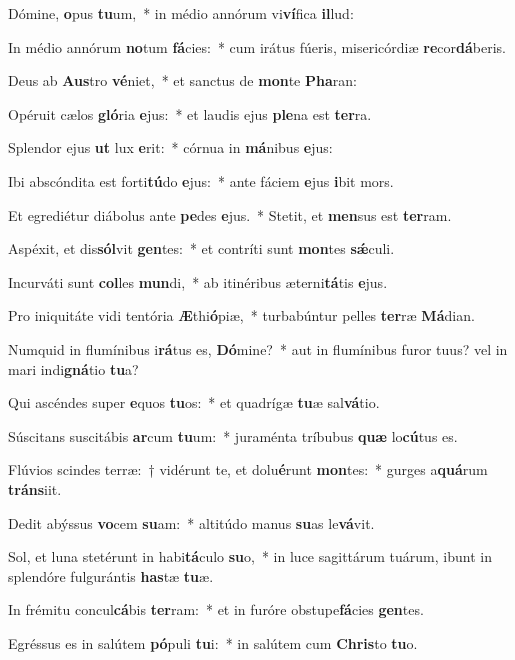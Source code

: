 \item Dómine, \textbf{o}pus \textbf{tu}um,~* in médio annórum vi\textbf{ví}fica \textbf{il}lud:
\item In médio annórum \textbf{no}tum \textbf{fá}cies:~* cum irátus fúeris, misericórdiæ \textbf{re}cor\textbf{dá}beris.
\item Deus ab \textbf{Aus}tro \textbf{vé}niet,~* et sanctus de \textbf{mon}te \textbf{Pha}ran:
\item Opéruit cælos \textbf{gló}ria \textbf{e}jus:~* et laudis ejus \textbf{ple}na est \textbf{ter}ra.
\item Splendor ejus \textbf{ut} lux \textbf{e}rit:~* córnua in \textbf{má}nibus \textbf{e}jus:
\item Ibi abscóndita est forti\textbf{tú}do \textbf{e}jus:~* ante fáciem \textbf{e}jus \textbf{i}bit mors.
\item Et egrediétur diábolus ante \textbf{pe}des \textbf{e}jus.~* Stetit, et \textbf{men}sus est \textbf{ter}ram.
\item Aspéxit, et dis\textbf{sól}vit \textbf{gen}tes:~* et contríti sunt \textbf{mon}tes \textbf{sǽ}culi.
\item Incurváti sunt \textbf{col}les \textbf{mun}di,~* ab itinéribus æterni\textbf{tá}tis \textbf{e}jus.
\item Pro iniquitáte vidi tentória \textbf{Æ}thi\textbf{ó}piæ,~* turbabúntur pelles \textbf{ter}ræ \textbf{Má}dian.
\item Numquid in flumínibus i\textbf{rá}tus es, \textbf{Dó}mine?~* aut in flumínibus furor tuus? vel in mari indi\textbf{gná}tio \textbf{tu}a?
\item Qui ascéndes super \textbf{e}quos \textbf{tu}os:~* et quadrígæ \textbf{tu}æ sal\textbf{vá}tio.
\item Súscitans suscitábis \textbf{ar}cum \textbf{tu}um:~* juraménta tríbubus \textbf{quæ} lo\textbf{cú}tus es.
\item Flúvios scindes terræ:~† vidérunt te, et dolu\textbf{é}runt \textbf{mon}tes:~* gurges a\textbf{quá}rum \textbf{tráns}iit.
\item Dedit abýssus \textbf{vo}cem \textbf{su}am:~* altitúdo manus \textbf{su}as le\textbf{vá}vit.
\item Sol, et luna stetérunt in habi\textbf{tá}culo \textbf{su}o,~* in luce sagittárum tuárum, ibunt in splendóre fulgurántis \textbf{has}tæ \textbf{tu}æ.
\item In frémitu concul\textbf{cá}bis \textbf{ter}ram:~* et in furóre obstupe\textbf{fá}cies \textbf{gen}tes.
\item Egréssus es in salútem \textbf{pó}puli \textbf{tu}i:~* in salútem cum \textbf{Chris}to \textbf{tu}o.
